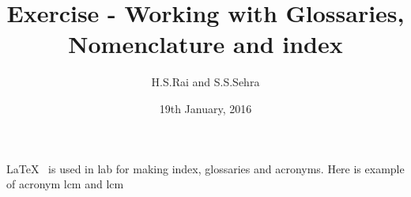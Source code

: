 \documentclass[11pt,a4paper]{article}
\title{Exercise - Working with Glossaries, Nomenclature and index}
\date{19th January, 2016}
\author{H.S.Rai and S.S.Sehra}
\begin{document}
\maketitle

\LaTeX\ \index{\LaTeX} is used in \gls{lab} for making index, glossaries and acronyms. Here is example of acronym \acrlong{lcm} and \acrshort{lcm}

\printindex
\printglossary[type=\acronymtype]
\printglossary
\printnomenclature
\end{document}
